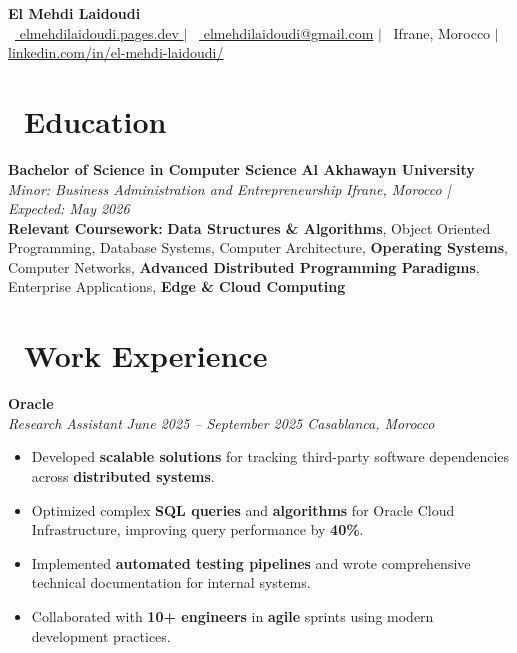 \documentclass[a4paper, 10pt]{article}
\begin{document}
\begin{center}
    \textbf{\huge El Mehdi Laidoudi} \\[4pt]
    \normalsize
    \faGlobe\ \href{https://elmehdilaidoudi.pages.dev}{ elmehdilaidoudi.pages.dev } $|$
    \faEnvelope\ \href{mailto:elmehdilaidoudi@gmail.com}{ elmehdilaidoudi@gmail.com} $|$ 
    \faMapMarker*\ Ifrane, Morocco $|$ 
    \faLinkedin\ \href{https://linkedin.com/in/el-mehdi-laidoudi/}{ linkedin.com/in/el-mehdi-laidoudi/} 
\end{center}
\vspace{-5pt}

\section{\faGraduationCap\  Education}
\textbf{Bachelor of Science in Computer Science} \hfill \textbf{Al Akhawayn University} \\
\textit{Minor: Business Administration and Entrepreneurship} \hfill \textit{Ifrane, Morocco | Expected: May 2026} \\
\textbf{Relevant Coursework:} \textbf{Data Structures \& Algorithms}, Object Oriented Programming, Database Systems, Computer Architecture, \textbf{Operating Systems}, Computer Networks, \textbf{Advanced Distributed Programming Paradigms}, Enterprise Applications, \textbf{Edge \& Cloud Computing}

\section{\faBriefcase\ Work Experience} 

\textbf{Oracle} \\
\textit{Research Assistant} \hfill \textit{June 2025 -- September 2025 \textbar{} Casablanca, Morocco}
\begin{itemize}[leftmargin=10pt, itemsep=0pt, topsep=1pt, parsep=0pt]
\item Developed \textbf{scalable solutions} for tracking third-party software dependencies across \textbf{distributed systems}.
\item Optimized complex \textbf{SQL queries} and \textbf{algorithms} for Oracle Cloud Infrastructure, improving query performance by \textbf{40\%}.
\item Implemented \textbf{automated testing pipelines} and wrote comprehensive technical documentation for internal systems.
\item Collaborated with \textbf{10+ engineers} in \textbf{agile} sprints using modern development practices.
\end{itemize}
\end{document}
